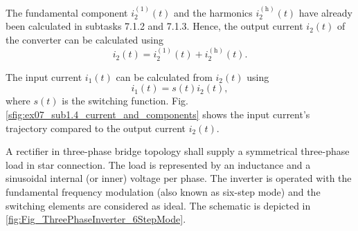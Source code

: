 
\newpage
\begin{solutionblock}
The fundamental component $i^\mathrm{(1)}_\mathrm{2}(t)$ and the harmonics $i^{(\mathrm{h})}_\mathrm{2}(t)$ have already been calculated in subtasks 7.1.2 and 7.1.3. Hence,
the output current $i_\mathrm{2}(t)$ of the converter can be calculated using 
\begin{equation}
    i_\mathrm{2}(t) = i^\mathrm{(1)}_\mathrm{2}(t) + i^{(\mathrm{h})}_\mathrm{2}(t).
    \label{7.1.2:eq:approx_i_2}         
\end{equation}
\end{solutionblock} 


\begin{solutionblock}
    The input current $i_\mathrm{1}(t)$ can be calculated from $i_\mathrm{2}(t)$ using 
    \begin{equation}
        i_\mathrm{1}(t) = s(t) i_\mathrm{2}(t),
        \label{7.1.2:eq:input_current_i_1}         
    \end{equation}
    where $s(t)$ is the switching function. Fig. \ref{sfig:ex07_sub1.4_current_and_components} shows the input current's trajectory
    compared to the output current $i_\mathrm{2}(t)$.
    \end{solutionblock}








\newpage


A rectifier in three-phase bridge topology shall supply a
symmetrical three-phase load in star connection. The load is represented by an inductance and 
a sinusoidal internal (or inner) voltage per phase. The inverter is operated with the fundamental 
frequency modulation (also known as six-step mode) and the switching elements are considered as ideal. 
The schematic is depicted in \autoref{fig:Fig_ThreePhaseInverter_6StepMode}.

